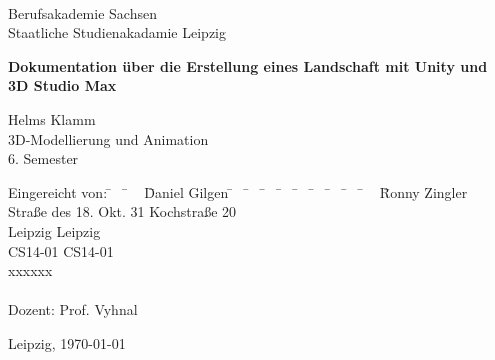 	\begin{titlepage}
		
		\begin{center}
			~\\[0cm]
			Berufsakademie Sachsen \\
			Staatliche Studienakadamie Leipzig \\[2.0cm]
			
			\begin{huge}
				\textbf{Dokumentation über die Erstellung eines Landschaft mit Unity und \\3D Studio Max} \\[2.4cm]
			\end{huge}
			
			\doublespacing
			
			Helms Klamm\\
			3D-Modellierung und Animation\\ 
			6. Semester \\[3.0cm]
		\end{center}
		
		\onehalfspacing
		\begin{tabbing}
			Eingereicht von:  \= ~ \= ~ \= Daniel Gilgen \= ~ \= ~ \= ~ \= ~ \= ~ \= ~ \= ~ \= ~ \= ~ \= Ronny Zingler \\
			  \> \> \> Straße des 18. Okt. 31 	\> \> \> \> \> \> \> \> \> \> Kochstraße 20 \\
			  \> \>  Leipzig \> \> \> \> \> \> \> \> \>   Leipzig \\
			  \> \> \> CS14-01 	\> \> \> \> \> \> \> \> \> \>  CS14-01 \\
			  \> \>  \> \> \> \> \> \> \> \> \> \>  xxxxxx \\
			\\
			Dozent:  \> \> \> Prof. Vyhnal \\
		\end{tabbing}
		\vspace*{\fill}
		Leipzig, \today
		
	\end{titlepage}
